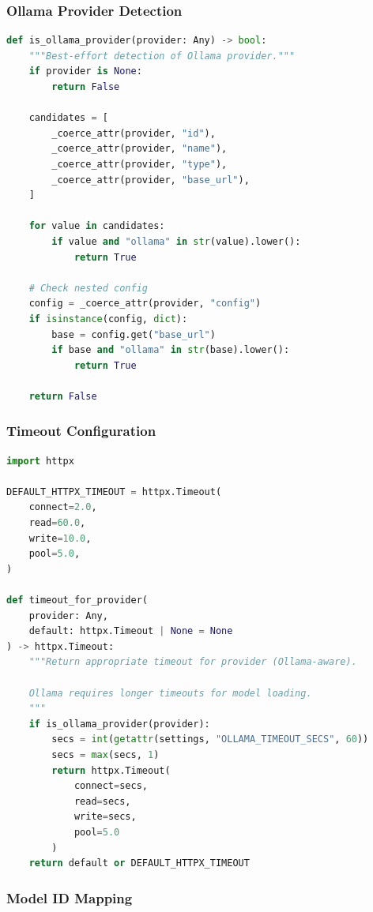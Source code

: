 \subsubsection{Ollama Provider Detection}

\begin{lstlisting}[language=Python, caption={Ollama provider detection heuristics.}]
def is_ollama_provider(provider: Any) -> bool:
    """Best-effort detection of Ollama provider."""
    if provider is None:
        return False
    
    candidates = [
        _coerce_attr(provider, "id"),
        _coerce_attr(provider, "name"),
        _coerce_attr(provider, "type"),
        _coerce_attr(provider, "base_url"),
    ]
    
    for value in candidates:
        if value and "ollama" in str(value).lower():
            return True
    
    # Check nested config
    config = _coerce_attr(provider, "config")
    if isinstance(config, dict):
        base = config.get("base_url")
        if base and "ollama" in str(base).lower():
            return True
    
    return False
\end{lstlisting}

\subsubsection{Timeout Configuration}

\begin{lstlisting}[language=Python, caption={Provider-aware timeout configuration.}]
import httpx

DEFAULT_HTTPX_TIMEOUT = httpx.Timeout(
    connect=2.0,
    read=60.0,
    write=10.0,
    pool=5.0,
)

def timeout_for_provider(
    provider: Any, 
    default: httpx.Timeout | None = None
) -> httpx.Timeout:
    """Return appropriate timeout for provider (Ollama-aware).
    
    Ollama requires longer timeouts for model loading.
    """
    if is_ollama_provider(provider):
        secs = int(getattr(settings, "OLLAMA_TIMEOUT_SECS", 60))
        secs = max(secs, 1)
        return httpx.Timeout(
            connect=secs, 
            read=secs, 
            write=secs, 
            pool=5.0
        )
    return default or DEFAULT_HTTPX_TIMEOUT
\end{lstlisting}

\subsubsection{Model ID Mapping}

